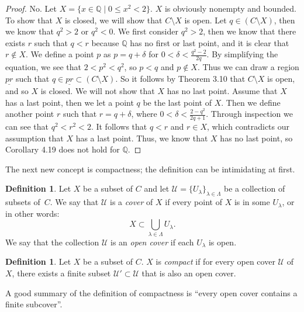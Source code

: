 \documentclass[12pt]{article}
\renewcommand{\_}[1]{\underline{ #1 }}
\theoremstyle{definition}
\newtheorem{definition}[theorem]{Definition}
\numberwithin{equation}{subsection}
\begin{document}
\begin{proof} %
No. Let $X = \{x \in \mathbb{Q} \mid 0 \leq x^2 < 2\}$. $X$ is obviously nonempty and bounded. To show that $X$ is closed, we will show that $C \setminus X$ is open. Let $q \in (C \setminus X)$, then we know that $q^2 > 2$ or $q^2 < 0$. We first consider $q^2 > 2$, then we know that there exists $r$ such that $q < r$ because $\mathbb{Q}$ has no first or last point, and it is clear that $r \not \in X$. We define a point $p$ as $p = q + \delta$ for $0 < \delta < \frac{q^2 - 2}{2q}$. By simplifying the equation, we see that $2 < p^2 < q^2$, so $p < q$ and $p \not \in X$. Thus we can draw a region $\_{pr}$ such that $q \in \_{pr} \subset (C \setminus X)$. So it follows by Theorem 3.10 that $C \setminus X$ is open, and so $X$ is closed.
We will not show that $X$ has no last point. Assume that $X$ has a last point, then we let a point $q$ be the last point of $X$. Then we define another point $r$ such that $r = q + \delta$, where $0 < \delta < \frac{2 - q^2}{2q + 1}$. Through inspection we can see that $q^2 < r^2 < 2$. It follows that $q < r$ and $r \in X$, which contradicts our assumption that $X$ has a last point. Thus, we know that $X$ has no last point, so Corollary 4.19 does not hold for $\mathbb{Q}$.
\end{proof}



The next new concept is compactness; the definition can be intimidating at first.  


\begin{definition}  Let $X$ be a subset of $C$ and let $\mathcal{U} = \{ U_{\lambda} \}_{\lambda \in \Lambda}$ be a collection of subsets of~$C$.  We say that $\mathcal{U}$ is a \emph{cover} of $X$ if every point of $X$ is in some $U_{\lambda}$, or in other words:
\[
X \subset \bigcup_{\lambda \in \Lambda} U_{\lambda}.
\]
We say that the collection $\mathcal{U}$ is an \emph{open cover} if each $U_{\lambda}$ is open.
\end{definition}

\begin{definition}  Let $X$ be a subset of $C$.  $X$ is \emph{compact} if for every open cover $\mathcal{U}$ of $X$, there exists a finite subset $\mathcal{U}' \subset \mathcal{U}$ that is also an open cover.
\end{definition}

\noindent  A good summary of the definition of compactness is ``every open cover contains a finite subcover''.
\end{document}
